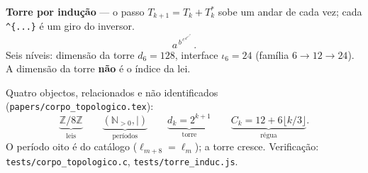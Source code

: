 \documentclass[11pt,a4paper]{article}
\newcommand{\code}[1]{\texttt{#1}}
\begin{document}
\noindent\textbf{Torre por indução} --- o passo $T_{k+1}=T_k+T_k^{*}$ sobe um andar de cada vez;
cada \texttt{\^{}\{...\}} é um giro do inversor.
\[
  a^{\,b^{\,c^{\,d^{\,e^{\,f^{\,g}}}}}}\,.
\]
Seis níveis: dimensão da torre $d_6=128$, interface $\iota_6=24$
(família $6\to12\to24$). A dimensão da torre \textbf{não} é o índice da lei.

\medskip\noindent Quatro objectos, relacionados e não identificados
(\code{papers/corpo\_topologico.tex}):
\[
\underbrace{\mathbb{Z}/8\mathbb{Z}}_{\text{leis}}
\qquad
\underbrace{(\mathbb{N}_{>0},\mid)}_{\text{períodos}}
\qquad
\underbrace{d_k=2^{k+1}}_{\text{torre}}
\qquad
\underbrace{C_k=12+6\lfloor k/3\rfloor}_{\text{régua}}.
\]
O período oito é do catálogo ($\ell_{m+8}=\ell_m$); a torre cresce.
Verificação: \code{tests/corpo\_topologico.c}, \code{tests/torre\_induc.js}.
\end{document}
